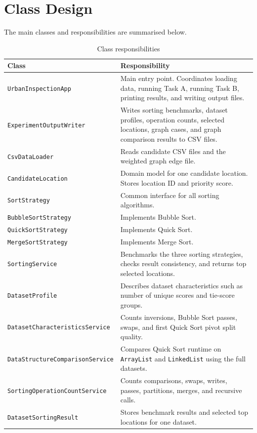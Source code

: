 \documentclass[12pt,a4paper,twocolumn,openany]{report}
\begin{document}
\section{Class Design}
The main classes and responsibilities are summarised below.

\begin{table}[t]
\centering
\caption{Class responsibilities}
\scriptsize
\setlength{\tabcolsep}{4pt}
\begin{tabularx}{\textwidth}{@{}p{3.6cm}X@{}}
\toprule
Class & Responsibility \\
\midrule
\texttt{UrbanInspectionApp} & Main entry point. Coordinates loading data, running Task A, running Task B, printing results, and writing output files. \\
\texttt{ExperimentOutputWriter} & Writes sorting benchmarks, dataset profiles, operation counts, selected locations, graph cases, and graph comparison results to CSV files. \\
\texttt{CsvDataLoader} & Reads candidate CSV files and the weighted graph edge file. \\
\texttt{CandidateLocation} & Domain model for one candidate location. Stores location ID and priority score. \\
\texttt{SortStrategy} & Common interface for all sorting algorithms. \\
\texttt{BubbleSortStrategy} & Implements Bubble Sort. \\
\texttt{QuickSortStrategy} & Implements Quick Sort. \\
\texttt{MergeSortStrategy} & Implements Merge Sort. \\
\texttt{SortingService} & Benchmarks the three sorting strategies, checks result consistency, and returns top selected locations. \\
\texttt{DatasetProfile} & Describes dataset characteristics such as number of unique scores and tie-score groups. \\
\texttt{DatasetCharacteristicsService} & Counts inversions, Bubble Sort passes, swaps, and first Quick Sort pivot split quality. \\
\texttt{DataStructureComparisonService} & Compares Quick Sort runtime on \texttt{ArrayList} and \texttt{LinkedList} using the full datasets. \\
\texttt{SortingOperationCountService} & Counts comparisons, swaps, writes, passes, partitions, merges, and recursive calls. \\
\texttt{DatasetSortingResult} & Stores benchmark results and selected top locations for one dataset. \\

\end{tabularx}
\end{table}
\end{document}
